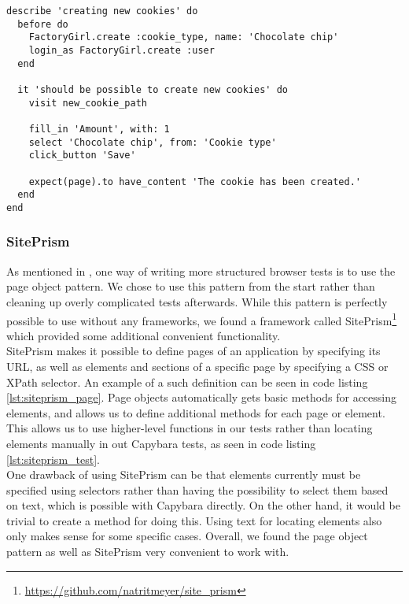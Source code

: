 \begin{lstlisting}[caption=A browser test written in RSpec using Capybara.,
                   label=lst:capybara, float=t]
describe 'creating new cookies' do
  before do
    FactoryGirl.create :cookie_type, name: 'Chocolate chip'
    login_as FactoryGirl.create :user
  end

  it 'should be possible to create new cookies' do
    visit new_cookie_path

    fill_in 'Amount', with: 1
    select 'Chocolate chip', from: 'Cookie type'
    click_button 'Save'

    expect(page).to have_content 'The cookie has been created.'
  end
end
\end{lstlisting}


\subsubsection{SitePrism}

As mentioned in , one way of writing more
structured browser tests is to use the page object pattern. We chose to
use this pattern from the start rather than cleaning up overly
complicated tests afterwards. While this pattern is perfectly possible
to use without any frameworks, we found a framework called
SitePrism\footnote{\url{https://github.com/natritmeyer/site_prism}}
which provided some additional convenient functionality.\\

SitePrism makes it possible to define pages of an application by
specifying its URL, as well as elements and sections of a specific page
by specifying a CSS or XPath selector. An example of a such definition
can be seen in code listing \ref{lst:siteprism_page}. Page objects
automatically gets basic methods for accessing elements, and allows us
to define additional methods for each page or element. This allows us to
use higher-level functions in our tests rather than locating elements
manually in out Capybara tests, as seen in code listing
\ref{lst:siteprism_test}.\\

One drawback of using SitePrism can be that elements currently must be
specified using selectors rather than having the possibility to select
them based on text, which is possible with Capybara directly. On the
other hand, it would be trivial to create a method for doing this. Using
text for locating elements also only makes sense for some specific
cases. Overall, we found the page object pattern as well as SitePrism
very convenient to work with.\\

